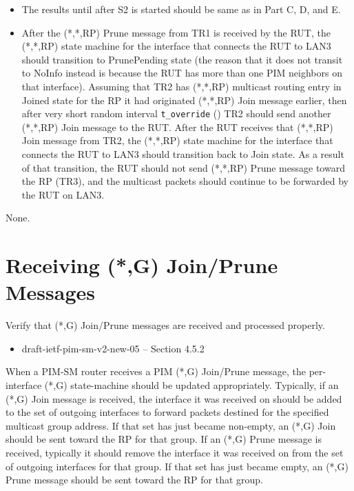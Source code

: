 \documentclass[11pt]{report}
\begin{document}

\begin{itemize}

  \item The results until after S2 is started should be same as in
  Part C, D, and E.

  \item After the (*,*,RP) Prune message from TR1 is received by the RUT,
  the (*,*,RP) state machine for the interface that connects the RUT to
  LAN3 should transition to PrunePending state (the reason that it does
  not transit to NoInfo instead is because the RUT has more than one PIM
  neighbors on that interface).
  Assuming that TR2 has (*,*,RP) multicast routing entry in Joined state
  for the RP it had originated (*,*,RP) Join message earlier, then after
  very short random interval \verb=t_override= ({\PimsmTOverride}) TR2
  should send another (*,*,RP) Join message to the RUT.
  After the RUT receives that (*,*,RP) Join message from TR2,
  the (*,*,RP) state machine for the interface that connects the RUT to
  LAN3 should transition back to Join state.
  As a result of that transition, the RUT should not send (*,*,RP) Prune
  message toward the RP (TR3), and the multicast packets should continue
  to be forwarded by the RUT on LAN3.

\end{itemize}

None.

\newpage
\section{Receiving (*,G) Join/Prune Messages}

Verify that (*,G) Join/Prune messages are received and processed
properly.

\begin{itemize}
  \item draft-ietf-pim-sm-v2-new-05 -- Section 4.5.2
\end{itemize}

When a PIM-SM router receives a PIM (*,G) Join/Prune message, the
per-interface (*,G) state-machine should be updated appropriately.
Typically, if an (*,G) Join message is received, the interface it was
received on should be added to the set of outgoing interfaces to
forward packets destined for the specified multicast group address.
If that set has just became non-empty, an (*,G) Join should be sent
toward the RP for that group.
If an (*,G) Prune message is received, typically it should remove
the interface it was received on from the set of outgoing interfaces
for that group. If
that set has just became empty, an (*,G) Prune message should be
sent toward the RP for that group.
\end{document}

